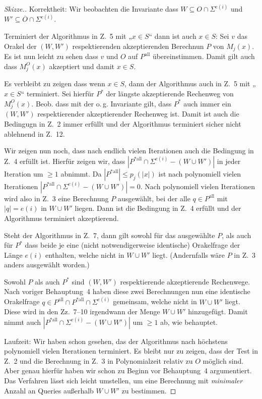 \documentclass[nofonts]{uebung}
\begin{document}
\begin{proof}[Skizze.]
    Korrektheit: Wir beobachten die Invariante dass $W\subseteq O\cap\Sigma^{e(i)}$ und $W'\subseteq \overline{O}\cap\Sigma^{e(i)}$. 

    Terminiert der Algorithmus in Z.~5 mit „$x\in S$“ dann ist auch $x\in S$: Sei $v$ das Orakel der $(W, W')$ respektierenden akzeptierenden Berechnun $P$ von $M_j(x)$. Es ist nun leicht zu sehen dass $v$ und $O$ auf $P^\mathrm{all}$ übereinstimmen. Damit gilt auch dass $M_j^O(x)$ akzeptiert und damit $x\in S$.

    Es verbleibt zu zeigen dass wenn $x\in S$, dann der Algorithmus auch in Z.~5 mit „$x\in S$“ terminiert.
    Sei hierfür $P^*$ der längste akzeptierende Rechenweg von $M_j^O(x)$.
    Beob. dass mit der o.\,g. Invariante gilt, dass $P^*$ auch immer ein $(W,W')$ respektierender akzeptierender Rechenweg ist.
    Damit ist auch die Bedingugn in Z.~2 immer erfüllt und der Algorithmus terminiert sicher nicht ablehnend in Z.~12.

    Wir zeigen nun noch, dass nach endlich vielen Iterationen auch die Bedingung in Z.~4 erfüllt ist.
    Hierfür zeigen wir, dass $|P^{*\mathrm{all}}\cap \Sigma^{e(i)}-(W\cup W')|$ in jeder Iteration um $\geq 1$ abnimmt. Da $|P^{*\mathrm{all}}|\leq p_j(|x|)$ ist nach polynomiell vielen Iterationen $|P^{*\mathrm{all}}\cap \Sigma^{e(i)}-(W\cup W')|=0$.
    Nach polynomiell vielen Iterationen wird also in Z.~3 eine Berechnung $P$ ausgewählt, bei der alle $q\in P^{\mathrm{all}}$ mit $|q|=e(i)$ in $W\cup W'$ liegen. Dann ist die Bedingung in Z.~4 erfüllt und der Algorithmus terminiert akzeptierend.

    Steht der Algorithmus in Z.~7, dann gilt sowohl für das ausgewählte $P$, als auch für $P^*$ dass beide je eine (nicht notwendigerweise identische) Orakelfrage der Länge $e(i)$ enthalten, welche nicht in $W\cup W'$ liegt. (Andernfalls  wäre $P$ in Z.~3 anders ausgewählt worden.)

    Sowohl $P$ als auch $P^*$ sind $(W, W')$ respektierende akzeptierende Rechenwege. Nach voriger Behauptung~4 haben diese zwei Berechnungen nun eine identische Orakelfrage $q\in P^\mathrm{all}\cap P^{*\mathrm{all}}\cap \Sigma^{e(i)}$ gemeinsam, welche nicht in $W\cup W'$ liegt.
    Diese wird in den Zz.~7--10 irgendwann der Menge $W\cup W'$ hinzugefügt.
    Damit nimmt auch $|P^{*\mathrm{all}}\cap \Sigma^{e(i)}-(W\cup W')|$ um $\geq 1$ ab, wie behauptet.
    \medskip

    Laufzeit:
    Wir haben schon gesehen, das der Algorithmus nach höchstens polynomiell vielen Iterationen terminiert.
    Es bleibt nur zu zeigen, dass der Test in Z.~2 und die Berechnung in Z.~3  in Polynomialzeit relativ zu $O$ möglich sind.
    Aber genau hierfür haben wir schon zu Beginn vor Behauptung~4 argumentiert. Das Verfahren lässt sich leicht umstellen, um eine Berechnung mit \emph{minimaler} Anzahl an Queries außerhalb $W\cup W'$ zu bestimmen.
\end{proof}
\end{document}
